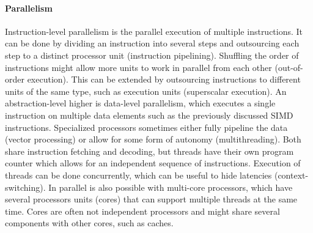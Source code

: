 \documentclass{article}
\begin{document}
\paragraph{Parallelism}
Instruction-level parallelism is the parallel execution of multiple instructions\cite{instruction-level-parallelism}.
It can be done by dividing an instruction into several steps and outsourcing each step to a distinct processor unit (instruction pipelining).
Shuffling the order of instructions might allow more units to work in parallel from each other (out-of-order execution).
This can be extended by outsourcing instructions to different units of the same type, such as execution units (superscalar execution).
An abstraction-level higher is data-level parallelism, which executes a single instruction on multiple data elements such as the previously discussed SIMD instructions.
Specialized processors sometimes either fully pipeline the data (vector processing) or allow for some form of autonomy (multithreading). 
Both share instruction fetching and decoding, but threads have their own program counter which allows for an independent sequence of instructions.
Execution of threads can be done concurrently, which can be useful to hide latencies (context-switching).
In parallel is also possible with multi-core processors, which have several processors units (cores) that can support multiple threads at the same time.
Cores are often not independent processors and might share several components with other cores, such as caches\cite{thread-level-parallelism}.
\end{document}
